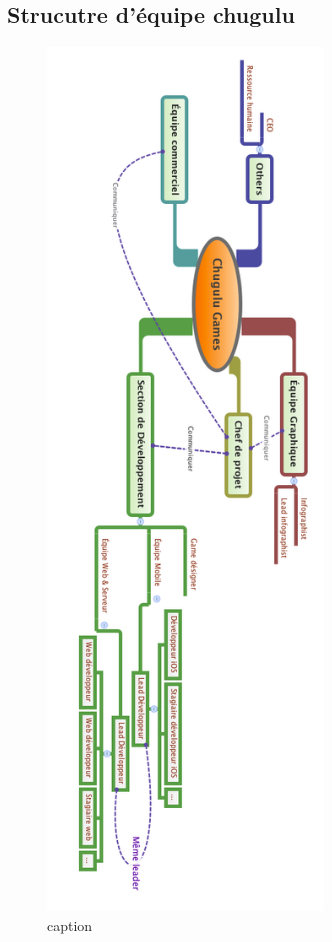 
\subsection{Strucutre d'équipe chugulu} %
\label{sub:strucutre_d_équipe_chugulu}


\begin{figure}[htbp]
	\centering
		\includegraphics[height=9in]{XMinds/EquipeChuguluGames.png}
	\caption{caption}
	\label{fig:XMinds_EquipeChuguluGames}
\end{figure}


